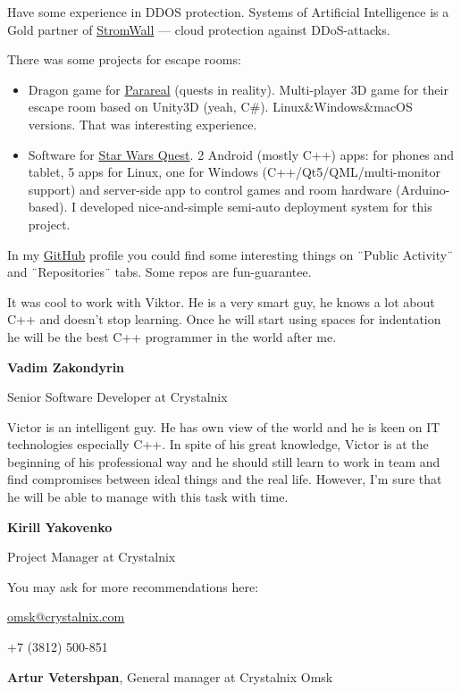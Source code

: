 \documentclass[letterpaper,11pt]{article}
\newlength{\outerbordwidth}
\newcommand{\resheading}[1]{\vspace{5pt}
  \parbox{\textwidth}{\setlength{\FrameSep}{\outerbordwidth}
    \begin{shaded}
\setlength{\fboxsep}{0pt}\framebox[\textwidth][l]{\setlength{\fboxsep}{4pt}\fcolorbox{shadecolorB}{shadecolorB}{\textbf{\sffamily{\mbox{~}\makebox[6.762in][l]{\large #1} \vphantom{p\^{E}}}}}}
    \end{shaded}
  }\vspace{-5pt}
}
\begin{document}
	
	Have some experience in DDOS protection. Systems of Artificial Intelligence is a Gold partner of \href{https://stormwall.pro/en/}{StromWall} --- cloud protection against DDoS-attacks.
	
	There was some projects for escape rooms:
	\begin{itemize}
		\item Dragon game for \href{http://neoskazka.ru/index.html}{Parareal} (quests in reality). Multi-player 3D game for their escape room based on Unity3D (yeah, C\#). Linux\&Windows\&macOS versions. That was interesting experience.
		\item Software for \href{URL}{Star Wars Quest}. 2 Android (mostly C++) apps: for phones and tablet, 5 apps for Linux, one for Windows (C++/Qt5/QML/multi-monitor support) and server-side app to control games and room hardware (Arduino-based). I developed nice-and-simple semi-auto deployment system for this project.
	\end{itemize}
	
	In my \href{https://github.com/RussianBruteForce}{GitHub} profile you could find some interesting things on ¨Public Activity¨ and ¨Repositories¨ tabs. Some repos are fun-guarantee.

\pagebreak

\resheading{Reviews}

It was cool to work with Viktor. He is a very smart guy, he knows a lot about C++ and doesn't stop learning. Once he will start using spaces for indentation he will be the best C++ programmer in the world after me.

\begin{flushright}
	
\textbf{Vadim Zakondyrin}

Senior Software Developer at Crystalnix
\end{flushright}


Victor is an intelligent guy. He has own view of the world and he is keen on IT technologies especially C++. In spite of his great knowledge, Victor is at the beginning of his professional way and he should still learn to work in team and find compromises between ideal things and the real life. However, I'm sure that he will be able to manage with this task with time.

\begin{flushright}
	
	\textbf{Kirill Yakovenko}
	
	Project Manager at Crystalnix
\end{flushright}


You may ask for more recommendations here:

\href{mailto:omsk@crystalnix.com}{omsk@crystalnix.com}

+7 (3812) 500-851 

\textbf{Artur Vetershpan}, General manager at Crystalnix Omsk
\end{document}
